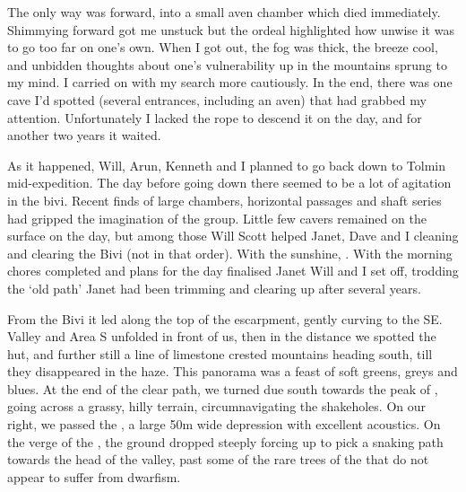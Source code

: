 The only way was forward, into a small aven chamber which died immediately. Shimmying forward got me unstuck but the ordeal highlighted how unwise it was to go too far on one's own. When I got out, the fog was thick, the breeze cool, and unbidden thoughts about one's vulnerability up in the mountains sprung to my mind. I carried on with my search more cautiously. In the end, there was one cave I'd spotted (several entrances, including an aven) that had grabbed my attention. Unfortunately I lacked the rope to descend it on the day, and for another two years it waited.

As it happened, Will, Arun, Kenneth and I planned to go back down to Tolmin mid-expedition. The day before going down there seemed to be a lot of agitation in the bivi. Recent finds of large chambers, horizontal passages and shaft series had gripped the imagination of the group. Little few cavers remained on the surface on the day, but among those Will Scott helped Janet, Dave and I cleaning and clearing the Bivi (not in that order). With the sunshine, . With the morning chores completed and plans for the day finalised Janet Will and I set off, trodding the `old  path' Janet had been trimming and clearing up after several years. 

From the Bivi it led along the top of the  escarpment, gently curving to the SE.  Valley and Area S unfolded in front of us, then in the distance we spotted the  hut, and further still a line of limestone crested mountains heading south, till they disappeared in the haze. This panorama was a feast of soft greens, greys and blues. At the end of the clear path, we turned due south towards the peak of , going across a grassy, hilly terrain, circumnavigating the shakeholes. On our right, we passed the , a large 50m wide depression with excellent acoustics. On the verge of the , the ground dropped steeply forcing up to pick a snaking path towards the head of the valley, past some of the rare trees of the  that do not appear to suffer from dwarfism. 

